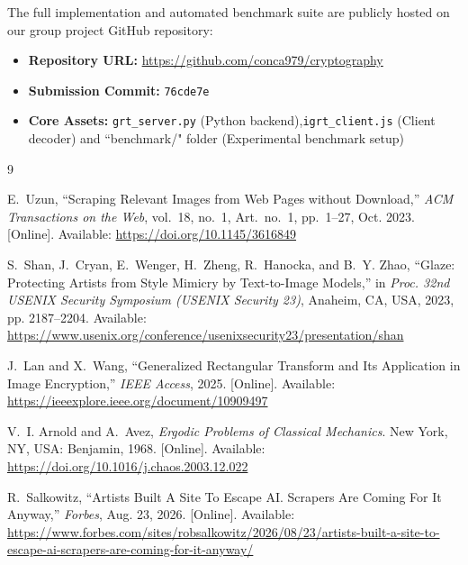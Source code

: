 \documentclass{article}
\begin{document}
\begin{tcolorbox}[
  colback=gray!5!white,
  colframe=gray!60!black,
  title=\textbf{Source Code \& Artifact Availability}
]

The full implementation and automated benchmark suite are publicly hosted on our group project GitHub repository:
\begin{itemize}
    \item \textbf{Repository URL:} \url{https://github.com/conca979/cryptography}
    \item \textbf{Submission Commit:} \texttt{76cde7e}
    \item \textbf{Core Assets:} \texttt{grt\_server.py} (Python backend),\texttt{igrt\_client.js} (Client decoder) and ``benchmark/" folder (Experimental benchmark setup)
\end{itemize}
\end{tcolorbox}
\label{artifact_box}


\begin{thebibliography}{9}

E.~Uzun, ``Scraping Relevant Images from Web Pages without Download,'' \emph{ACM Transactions on the Web}, vol.~18, no.~1, Art.~no.~1, pp.~1--27, Oct. 2023. [Online]. Available: \url{https://doi.org/10.1145/3616849}

S.~Shan, J.~Cryan, E.~Wenger, H.~Zheng, R.~Hanocka, and B.~Y. Zhao, ``Glaze: Protecting Artists from Style Mimicry by Text-to-Image Models,'' in \emph{Proc. 32nd USENIX Security Symposium (USENIX Security 23)}, Anaheim, CA, USA, 2023, pp. 2187--2204. Available: \url{https://www.usenix.org/conference/usenixsecurity23/presentation/shan}

J.~Lan and X.~Wang, ``Generalized Rectangular Transform and Its Application in Image Encryption,'' \emph{IEEE Access}, 2025. [Online]. Available: \url{https://ieeexplore.ieee.org/document/10909497}

V.~I. Arnold and A.~Avez, \emph{Ergodic Problems of Classical Mechanics}. New York, NY, USA: Benjamin, 1968. [Online]. Available: \url{https://doi.org/10.1016/j.chaos.2003.12.022}

R.~Salkowitz, ``Artists Built A Site To Escape AI. Scrapers Are Coming For It Anyway,'' \emph{Forbes}, Aug. 23, 2026. [Online]. Available: \url{https://www.forbes.com/sites/robsalkowitz/2026/08/23/artists-built-a-site-to-escape-ai-scrapers-are-coming-for-it-anyway/}

\end{thebibliography}
\end{document}
